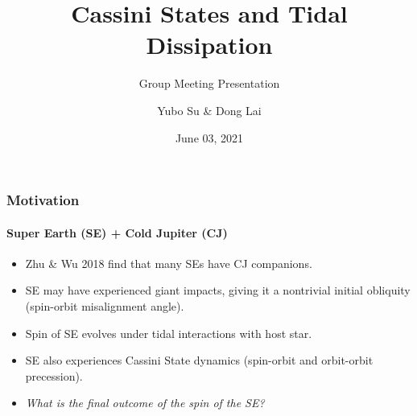 \documentclass[dvipsnames, 9pt]{beamer}
\begin{document}
\title{Cassini States and Tidal Dissipation}
\subtitle{Group Meeting Presentation}
\author{Yubo Su \& Dong Lai}
\date{June 03, 2021}

\maketitle

\begin{frame}
    \frametitle{Motivation}
    \framesubtitle{Super Earth (SE) + Cold Jupiter (CJ)}

    \begin{itemize}
        \item Zhu \& Wu 2018 find that many SEs have CJ companions.

        \item SE may have experienced giant impacts, giving it a
            nontrivial initial obliquity (spin-orbit misalignment
            angle).

        \item Spin of SE evolves under tidal interactions with host
            star.

        \item SE also experiences Cassini State dynamics (spin-orbit and
            orbit-orbit precession).

        \item \emph{What is the final outcome of the spin of the SE?}
    \end{itemize}
\end{frame}
\end{document}
